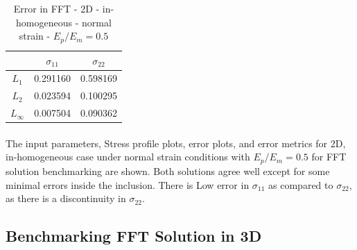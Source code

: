 \documentclass[12pt, a4paper]{report}
\begin{document}
\begin{table}[H]
    \centering
    \begin{tabular}{|c|c|c|}
        \hline
        &\textbf{$\sigma_{11}$} &  \textbf{$\sigma_{22}$} \\
        \hline
        $L_1$ & 0.291160 & 0.598169 \\
        \hline
        $L_2$ & 0.023594 & 0.100295 \\
        \hline 
        $L_\infty$ & 0.007504 & 0.090362 \\
        \hline
    \end{tabular}
    \caption{Error in FFT - 2D - in-homogeneous - normal strain - $E_p / E_m = 0.5$}
\end{table}

\paragraph{}
The input parameters, Stress profile plots, error plots, and error metrics for 2D, in-homogeneous case under normal strain conditions with $E_p / E_m = 0.5$ for FFT solution benchmarking are shown. Both solutions agree well except for some minimal errors inside the inclusion. There is Low error in $\sigma_{11}$ as compared to $\sigma_{22}$, as there is a discontinuity in $\sigma_{22}$.

\newpage
\subsection{Benchmarking FFT Solution in 3D}
\end{document}
